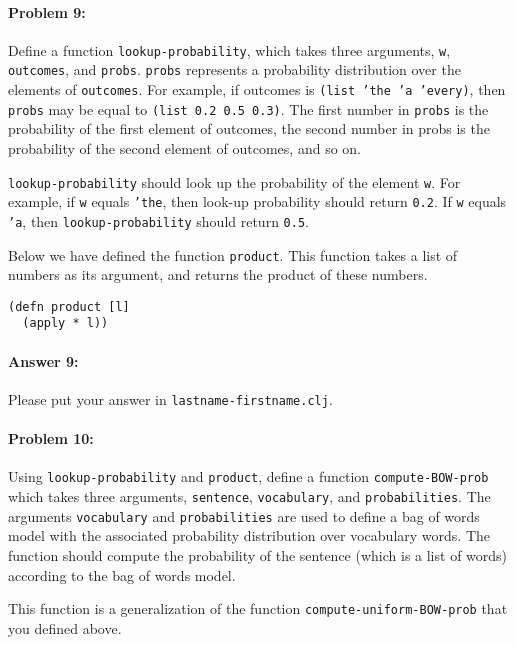 \documentclass[10pt]{article}
\begin{document}
\hrulefill
\paragraph{Problem 9:}

Define a function \texttt{lookup-probability}, which takes three
arguments, \texttt{w}, \texttt{outcomes}, and
\texttt{probs}. \texttt{probs} represents a probability distribution
over the elements of \texttt{outcomes}. For example, if outcomes is
\texttt{(list 'the 'a 'every)}, then \texttt{probs} may be equal to
\texttt{(list 0.2 0.5 0.3)}. The first number in \texttt{probs} is the
probability of the first element of outcomes, the second number in
probs is the probability of the second element of outcomes, and so on.

\texttt{lookup-probability} should look up the probability of the
element \texttt{w}. For example, if \texttt{w} equals \texttt{'the},
then look-up probability should return \texttt{0.2}. If \texttt{w}
equals \texttt{'a}, then \texttt{lookup-probability} should return
\texttt{0.5}.

Below we have defined the function \texttt{product}. This function takes a list
of numbers as its argument, and returns the product of these numbers.

\begin{lstlisting}
(defn product [l]
  (apply * l))
\end{lstlisting}

\paragraph{Answer 9:} Please put your answer in
\texttt{lastname-firstname.clj}.

\hrulefill
\paragraph{Problem 10:}

Using \texttt{lookup-probability} and \texttt{product}, define a
function \texttt{compute-BOW-prob} which takes three arguments,
\texttt{sentence}, \texttt{vocabulary}, and
\texttt{probabilities}. The arguments \texttt{vocabulary} and
\texttt{probabilities} are used to define a bag of words model with
the associated probability distribution over vocabulary words. The
function should compute the probability of the sentence (which is a
list of words) according to the bag of words model.

This function is a generalization of the function
\texttt{compute-uniform-BOW-prob} that you defined above.
\end{document}
